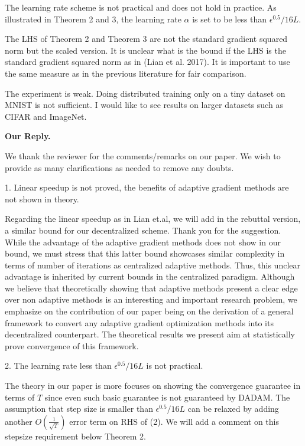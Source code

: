 \documentclass{article} %
\begin{document}
The learning rate scheme is not practical and does not hold in practice. As illustrated in Theorem 2 and 3, the learning rate $\alpha$ is set to be less than $\epsilon^{0.5}/16L$.

The LHS of Theorem 2 and Theorem 3 are not the standard gradient squared norm but the scaled version. It is unclear what is the bound if the LHS is the standard gradient squared norm as in (Lian et al. 2017). It is important to use the same measure as in the previous literature for fair comparison.

The experiment is weak. Doing distributed training only on a tiny dataset on MNIST is not sufficient. I would like to see results on larger datasets such as CIFAR and ImageNet.

\textbf{Our Reply.}

We thank the reviewer for the comments/remarks on our paper.
We wish to provide as many clarifications as needed to remove any doubts.

1. Linear speedup is not proved, the benefits of adaptive gradient methods are not shown in theory.

Regarding the linear speedup as in Lian et.al, we will add in the rebuttal version, a similar bound for our decentralized scheme. Thank you for the suggestion.
While the advantage of the adaptive gradient methods does not show in our bound, we must stress that this latter bound showcases similar complexity in terms of number of iterations as centralized adaptive methods. Thus, this unclear advantage is inherited by current bounds in the centralized paradigm.
Although we believe that theoretically showing that adaptive methods present a clear edge over non adaptive methods is an interesting and important research problem, we emphasize on the contribution of our paper being on the derivation of a general framework to convert any adaptive gradient optimization methods into its decentralized counterpart.
The theoretical results we present aim at statistically prove convergence of this framework.

2. The learning rate less than $\epsilon^{0.5}/16L$ is not practical. 

The theory in our paper is more focuses on showing the convergence guarantee in terms of $T$ since even such basic guarantee is not guaranteed by DADAM. The assumption that step size is smaller than $\epsilon^{0.5}/16L$ can be relaxed by adding another $O(\frac{1}{\sqrt{T}})$ error term on RHS of (2). We will add a comment on this stepsize requirement below Theorem 2.
\end{document}

